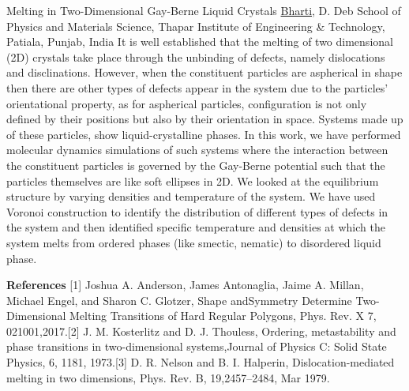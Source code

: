 
    \begin{abstract_online}{Melting in Two-Dimensional Gay-Berne Liquid Crystals}{%
        \underline{ Bharti}, D. Deb}{%
        }{%
        School of Physics and Materials Science, Thapar Institute of Engineering & Technology, Patiala, Punjab, India}
    It is well established that the melting of two dimensional (2D) crystals take place through the  unbinding of defects, namely dislocations and disclinations. However, when the constituent particles  are aspherical in shape then there are other types of defects appear in the system due to the particles’  orientational property, as for aspherical particles, configuration is not only defined by their positions  but also by their orientation in space. Systems made up of these particles, show liquid-crystalline  phases. In this work, we have performed molecular dynamics simulations of such systems where the  interaction between the constituent particles is governed by the Gay-Berne potential such that the  particles themselves are like soft ellipses in 2D. We looked at the equilibrium structure by varying  densities and temperature of the system. We have used Voronoi construction to identify the  distribution of different types of defects in the system and then identified specific temperature and  densities at which the system melts from ordered phases (like smectic, nematic) to disordered liquid  phase.  
    
        \textbf{References} \newline{}[1] Joshua A. Anderson, James Antonaglia, Jaime A. Millan, Michael Engel, and Sharon C. Glotzer, Shape and\newline{}Symmetry Determine Two-Dimensional Melting Transitions of Hard Regular Polygons, Phys. Rev. X 7, 021001,\newline{}2017.\newline{}[2] J. M. Kosterlitz and D. J. Thouless, Ordering, metastability and phase transitions in two-dimensional systems,\newline{}Journal of Physics C: Solid State Physics, 6, 1181, 1973.\newline{}[3] D. R. Nelson and B. I. Halperin, Dislocation-mediated melting in two dimensions, Phys. Rev. B, 19,\newline{}2457–2484, Mar 1979.
    \end{abstract_online}
    
